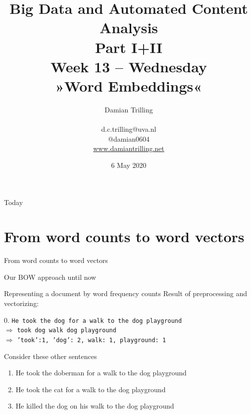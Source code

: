 \documentclass{beamer}
\begin{document}
\title[Big Data and Automated Content Analysis]{\textbf{Big Data and Automated Content Analysis\\ Part I+II} \\ Week 13 -- Wednesday \\ »Word Embeddings«}
\author[Damian Trilling]{Damian Trilling \\ ~ \\ \footnotesize{d.c.trilling@uva.nl \\@damian0604} \\ \url{www.damiantrilling.net}}
\date{6 May 2020}


\begin{frame}{}
\titlepage
\end{frame}

\begin{frame}{Today}
\tableofcontents
\end{frame}







\section{From word counts to word vectors}

\begin{frame}[plain]
From word counts to word vectors
\end{frame}


\begin{frame}{Our BOW approach until now}
\begin{block}{Representing a document by word frequency counts}
Result of preprocessing and vectorizing:

0. \texttt{He took the dog for a walk to the dog playground}\\
$\Rightarrow$ \texttt{took dog walk dog playground}\\
$\Rightarrow$ \texttt{'took':1, 'dog': 2, walk: 1, playground: 1}
\end{block}

Consider these other sentences
\begin{enumerate}
	\item<2-> He took the doberman for a walk to the dog playground
	\item<3-> He took the cat for a walk to the dog playground
	\item<4-> He killed the dog on his walk to the dog playground 
\end{enumerate}


\end{frame}
\end{document}
